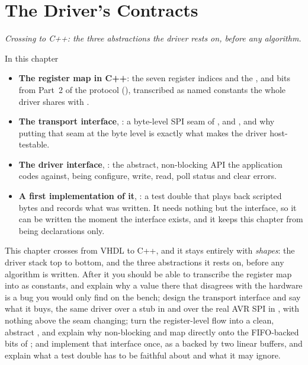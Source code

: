 
\chapter{The Driver's Contracts}
\label{c6:ch}

{\large\itshape Crossing to C++: the three abstractions the driver rests on, before any
algorithm.\par}

\begin{chapterbox}{In this chapter}
\begin{itemize}
  \item \textbf{The register map in C++}: the seven register indices and the ,
     and  bits from Part~2 of the protocol (),
    transcribed as named constants the whole driver shares with .
  \item \textbf{The transport interface}, : a byte-level SPI seam
    of ,  and , and why putting that seam at the byte level is
    exactly what makes the driver host-testable.
  \item \textbf{The driver interface}, : the abstract, non-blocking API
    the application codes against, being configure, write, read, poll status and clear errors.
  \item \textbf{A first implementation of it}, : a test double that plays
    back scripted bytes and records what was written. It needs nothing but the interface, so it can
    be written the moment the interface exists, and it keeps this chapter from being declarations
    only.
\end{itemize}
\end{chapterbox}

This chapter crosses from VHDL to C++, and it stays entirely with \emph{shapes}: the driver stack
top to bottom, and the three abstractions it rests on, before any algorithm is written. After it you
should be able to transcribe the register map into  as 
constants, and explain why a value there that disagrees with the hardware is a bug you would only
find on the bench; design the transport interface and say what it buys, the same driver over a stub
in  and over the real AVR SPI in , with nothing above the seam changing; turn
the register-level flow into a clean, abstract , and explain why non-blocking
 and  map directly onto the FIFO-backed  bits of ;
and implement that interface once, as a  backed by two linear buffers, and explain what a
test double has to be faithful about and what it may ignore.

